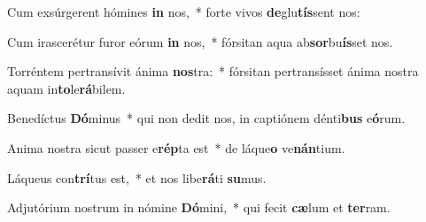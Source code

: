 \item Cum exsúrgerent hómines \textbf{in} nos,~* forte vivos \textbf{de}glu\textbf{tís}sent nos:
\item Cum irascerétur furor eórum \textbf{in} nos,~* fórsitan aqua ab\textbf{sor}bu\textbf{ís}set nos.
\item Torréntem pertransívit ánima \textbf{nos}tra:~* fórsitan pertransísset ánima nostra aquam in\textbf{to}le\textbf{rá}bilem.
\item Benedíctus \textbf{Dó}minus~* qui non dedit nos, in captiónem dénti\textbf{bus} e\textbf{ó}rum.
\item Anima nostra sicut passer e\textbf{rép}ta est~* de láque\textbf{o} ve\textbf{nán}tium.
\item Láqueus con\textbf{trí}tus est,~* et nos libe\textbf{rá}ti \textbf{su}mus.
\item Adjutórium nostrum in nómine \textbf{Dó}mini,~* qui fecit \textbf{cæ}lum et \textbf{ter}ram.
